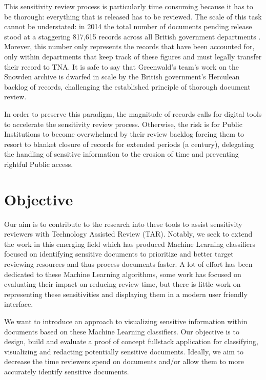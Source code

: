 \documentclass[\version]{l4proj}
\begin{document}
This sensitivity review process is particularly time consuming because it has to be thorough: everything that is released has to be reviewed.
The scale of this task cannot be understated: in 2014 the total number of documents pending release stood at a staggering 817,615 records across all British government departments \autocite{allanRecordsReview2014,thenationalarchivesRecordTransferReport2014}.
Morever, this number only represents the records that have been accounted for, only within departments that keep track of these figures and must legally transfer their record to TNA.
It is safe to say that Greenwald's team's work on the Snowden archive is dwarfed in scale by the British government's Herculean backlog of records, challenging the established principle of thorough document review.

In order to preserve this paradigm, the magnitude of records calls for digital tools to accelerate the sensitivity review process.
Otherwise, the risk is for Public Institutions to become overwhelmed by their review backlog forcing them to resort to blanket closure of records for extended periods (a century), delegating the handling of sensitive information to the erosion of time and preventing rightful Public access.

\section{Objective}

Our aim is to contribute to the research into these tools to assist sensitivity reviewers with Technology Assisted Review (TAR).
Notably, we seek to extend the work in this emerging field which has produced Machine Learning classifiers focused on identifying sensitive documents to prioritize and better target reviewing resources and thus process documents faster.
A lot of effort has been dedicated to these Machine Learning algorithms, some work has focused on evaluating their impact on reducing review time, but there is little work on representing these sensitivities and displaying them in a modern user friendly interface.

We want to introduce an approach to visualizing sensitive information within documents based on these Machine Learning classifiers.
Our objective is to design, build and evaluate a proof of concept fullstack application for classifying, visualizing and redacting potentially sensitive documents.
Ideally, we aim to decrease the time reviewers spend on documents and/or allow them to more accurately identify sensitive documents.
\end{document}
